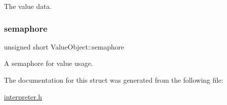 The value data. \mbox{\label{struct_value_object_a08cfa02ff5b2f4ee7307c62c95089373}} 
\subsubsection{\texorpdfstring{semaphore}{semaphore}}
{\footnotesize\ttfamily unsigned short Value\+Object\+::semaphore}

A semaphore for value usage. 

The documentation for this struct was generated from the following file\+:\begin{DoxyCompactItemize}
\item 
\hyperlink{interpreter_8h}{interpreter.\+h}\end{DoxyCompactItemize}
